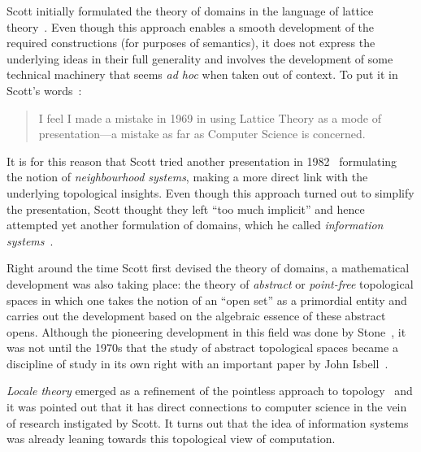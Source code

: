 \documentclass{article}
\begin{document}
Scott initially formulated the theory of domains in the language of lattice
theory~\cite{birkhoff:1940}. Even though this approach enables a smooth development of the
required constructions (for purposes of semantics), it does not express the underlying
ideas in their full generality and involves the development of some technical machinery
that seems \emph{ad hoc} when taken out of context. To put it in Scott's
words~\cite[pg.~577]{scott:1982}:

\begin{quote}
  I feel I made a mistake in 1969 in using Lattice Theory as a mode of
  presentation---a mistake as far as Computer Science is concerned.
\end{quote}

It is for this reason that Scott tried another presentation in 1982~\cite{scott:1981}
formulating the notion of \emph{neighbourhood systems}, making a more direct link with the
underlying topological insights. Even though this approach turned out to simplify the
presentation, Scott thought they left ``too much implicit'' and hence attempted yet
another formulation of domains, which he called
\emph{information systems}~\cite{scott:1982}.

Right around the time Scott first devised the theory of domains, a mathematical
development was also taking place: the theory of \emph{abstract} or \emph{point-free}
topological spaces in which one takes the notion of an ``open set'' as a primordial entity
and carries out the development based on the algebraic essence of these abstract opens.
Although the pioneering development in this field was done by Stone~\cite{stone:1934}, it
was not until the 1970s that the study of abstract topological spaces became a discipline
of study in its own right with an important paper by John Isbell~\cite{isbell:1973}.

\emph{Locale theory} emerged as a refinement of the pointless approach to topology~\cite{
johnstone:1982} and it was pointed out that it has direct connections to computer
science in the vein of research instigated by Scott. It turns out that the idea of
information systems was already leaning towards this topological view of computation.

\end{document}
